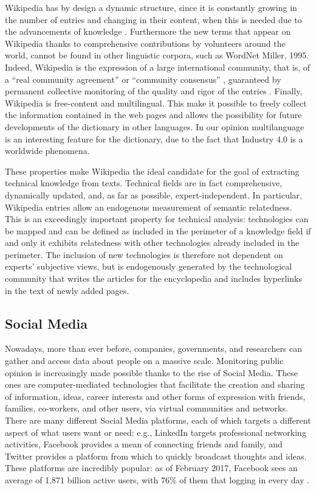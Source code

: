 \documentclass[]{book}
\begin{document}
Wikipedia has by design a dynamic structure, since it is constantly
growing in the number of entries and changing in their content, when
this is needed due to the advancements of knowledge
\citep{ponzetto2007knowledge}. Furthermore the new terms that appear on
Wikipedia thanks to comprehensive contributions by volunteers around the
world, cannot be found in other linguistic corpora, such as WordNet
Miller, 1995. Indeed, Wikipedia is the expression of a large
international community, that is, of a ``real community agreement''
\citep{bizer2009dbpedia} or ``community consensus''
\citep{hepp2007harvesting}, guaranteed by permanent collective
monitoring of the quality and rigor of the entries
\citep{bryant2005becoming}. Finally, Wikipedia is free-content and
multilingual. This make it possible to freely collect the information
contained in the web pages and allows the possibility for future
developments of the dictionary in other languages. In our opinion
multilanguage is an interesting feature for the dictionary, due to the
fact that Industry 4.0 is a worldwide phenomena.

These properties make Wikipedia the ideal candidate for the goal of
extracting technical knowledge from texts. Technical fields are in fact
comprehensive, dynamically updated, and, as far as possible,
expert-independent. In particular, Wikipedia entries allow an endogenous
measurement of semantic relatedness. This is an exceedingly important
property for technical analysis: technologies can be mapped and can be
defined as included in the perimeter of a knowledge field if and only it
exhibits relatedness with other technologies already included in the
perimeter. The inclusion of new technologies is therefore not dependent
on experts' subjective views, but is endogenously generated by the
technological community that writes the articles for the encyclopedia
and includes hyperlinks in the text of newly added pages.

\subsection{Social Media}\label{sotadocumentstwitter}

Nowadays, more than ever before, companies, governments, and researchers
can gather and access data about people on a massive scale. Monitoring
public opinion is increasingly made possible thanks to the rise of
Social Media. These ones are computer-mediated technologies that
facilitate the creation and sharing of information, ideas, career
interests and other forms of expression with friends, families,
co-workers, and other users, via virtual communities and networks. There
are many different Social Media platforms, each of which targets a
different aspect of what users want or need: e.g., LinkedIn targets
professional networking activities, Facebook provides a mean of
connecting friends and family, and Twitter provides a platform from
which to quickly broadcast thoughts and ideas. These platforms are
incredibly popular: as of February 2017, Facebook sees an average of
1,871 billion active users, with 76\% of them that logging in every day
\citep{tuten2017social}.
\end{document}
